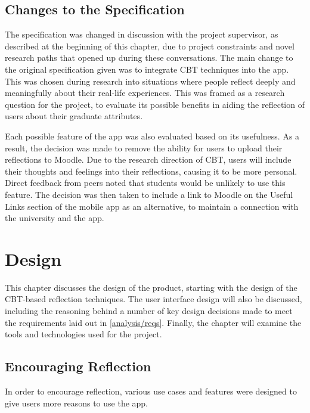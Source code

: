\documentclass{l4proj}
\begin{document}
\section{Changes to the Specification}

The specification was changed in discussion with the project supervisor, as described at the beginning of this chapter, due to project constraints and novel research paths that opened up during these conversations. The main change to the original specification given was to integrate CBT techniques into the app. This was chosen during research into situations where people reflect deeply and meaningfully about their real-life experiences. This was framed as a research question for the project, to evaluate its possible benefits in aiding the reflection of users about their graduate attributes. 

Each possible feature of the app was also evaluated based on its usefulness. As a result, the decision was made to remove the ability for users to upload their reflections to Moodle. Due to the research direction of CBT, users will include their thoughts and feelings into their reflections, causing it to be more personal. Direct feedback from peers noted that students would be unlikely to use this feature. The decision was then taken to include a link to Moodle on the Useful Links section of the mobile app as an alternative, to maintain a connection with the university and the app.


\chapter{Design}

This chapter discusses the design of the product, starting with the design of the CBT-based reflection techniques. The user interface design will also be discussed, including the reasoning behind a number of key design decisions made to meet the requirements laid out in \ref{analysis/reqs}. Finally, the chapter will examine the tools and technologies used for the project. 

\section{Encouraging Reflection}

In order to encourage reflection, various use cases and features were designed to give users more reasons to use the app.
\end{document}
